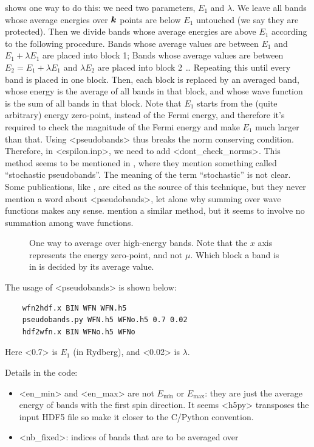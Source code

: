 \documentclass[hyperref, a4paper]{report}
\def\texttt#1{<#1>}%
\newcommand{\shortcode}[1]{\texttt{#1}}
\begin{document}
 shows one way to do this: 
we need two parameters, $E_1$ and $\lambda$.
We leave all bands whose average energies over $\vb*{k}$ points 
are below $E_1$ untouched (we say they are protected).
Then we divide bands whose average energies are above $E_1$ 
according to the following procedure.
Bands whose average values are between $E_1$ and $E_1 + \lambda E_1$ 
are placed into block 1;
Bands whose average values are between $E_2 = E_1 + \lambda E_1$ and $\lambda E_2$
are placed into block 2 \dots
Repeating this until every band is placed in one block.
Then, each block is replaced by an averaged band,
whose energy is the average of all bands in that block, 
and whose wave function is the sum of all bands in that block.
Note that $E_1$ starts from the (quite arbitrary) energy zero-point,
instead of the Fermi energy,
and therefore it's required to check 
the magnitude of the Fermi energy 
and make $E_1$ much larger than that.
Using \shortcode{pseudobands} thus breaks the norm conserving condition.
Therefore, in \shortcode{espilon.inp},
we need to add \shortcode{dont_check_norms}.
This method seems to be mentioned in \cite{del2019large,gao2022quasiparticle},
where they mention something called ``stochastic pseudobands''.
The meaning of the term ``stochastic'' is not clear.
Some publications, like \cite{hung2016excitation,del2019static},
are cited as the source of this technique,
but they never mention a word about \shortcode{pseudobands},
let alone why summing over wave functions makes any sense.
\cite{gaospeeding2016} mention a similar method, 
but it seems to involve no summation among wave functions.

\begin{figure}
    \centering
    
    \caption{One way to average over high-energy bands. 
    Note that the $x$ axis represents the energy zero-point, 
    and not $\mu$.
    Which block a band is in is decided by its average value.}
    \label{fig:pseudobands}
\end{figure}

The usage of \shortcode{pseudobands} is shown below:
\begin{lstlisting}
    wfn2hdf.x BIN WFN WFN.h5
    pseudobands.py WFN.h5 WFNo.h5 0.7 0.02
    hdf2wfn.x BIN WFNo.h5 WFNo
\end{lstlisting}
Here \shortcode{0.7} is $E_1$ (in Rydberg), 
and \shortcode{0.02} is $\lambda$.

Details in the code: 
\begin{itemize}
    \item \shortcode{en_min} and \shortcode{en_max} are not $E_{\text{min}}$ or $E_{\text{max}}$:
        they are just the average energy of bands with the first spin direction.
        It seems \shortcode{h5py} transposes the input HDF5 file 
        so make it closer to the C/Python convention.
    \item \shortcode{nb_fixed}: indices of bands that are to be averaged over 
\end{itemize}
\end{document}
